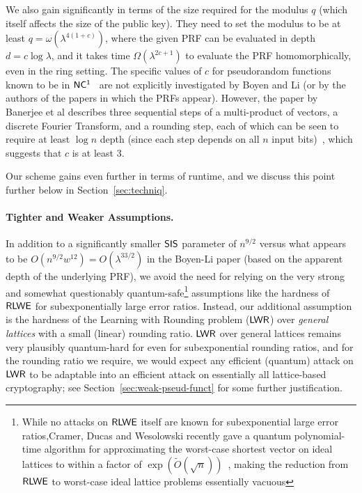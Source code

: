 We also gain significantly in terms of the size required for the
modulus $q$ (which itself affects the size of the public key). They
need to set the modulus to be at least $q=\omega(\lambda^{4(1+c)})$,
where the given PRF can be evaluated in depth $d=c\log{\lambda}$, and
it takes time $\Omega(\lambda^{2c+1})$ to evaluate the PRF
homomorphically, even in the ring setting. The specific values of $c$
for pseudorandom functions known to be in
$\mathsf{NC^{1}}$~\cite{DBLP:conf/eurocrypt/BanerjeePR12,DBLP:conf/crypto/0001P14,DBLP:journals/jacm/NaorR04,DBLP:conf/crypto/DottlingS15}
are not explicitly investigated by Boyen and Li (or by the authors of
the papers in which the PRFs appear). However, the paper by Banerjee
et al describes three sequential steps of a multi-product of vectors,
a discrete Fourier Transform, and a rounding step, each of which can
be seen to require at least $\log{n}$ depth (since each step depends
on all $n$ input bits)~\cite{DBLP:journals/siamcomp/ReifT92}, which suggests that $c$ is at least $3$.


Our scheme gains even further in terms of runtime, and we discuss this point further below in Section~\ref{sec:techniq}.

\paragraph{Tighter and Weaker Assumptions.}
In addition to a significantly smaller $\mathsf{SIS}$ parameter of $n^{9/2}$ versus
what appears to be $O(n^{9/2}w^{12})=O(\lambda^{33/2})$ in the
Boyen-Li paper (based on the apparent depth of the underlying PRF), we
avoid the need for relying on the very strong and somewhat
questionably quantum-safe\footnote{While no attacks on $\mathsf{RLWE}$ itself
  are known for subexponential large error ratios,Cramer, Ducas and
  Wesolowski recently gave a quantum polynomial-time algorithm for
  approximating the worst-case shortest vector on ideal lattices to
  within a factor of
  $\exp(\tilde{O}(\sqrt{n}))$~\cite{DBLP:journals/iacr/DucasS16},
  making the reduction from $\mathsf{RLWE}$ to worst-case ideal lattice
  problems essentially vacuous} assumptions like the hardness of
$\mathsf{RLWE}$ for subexponentially large error ratios. Instead, our
additional assumption is the hardness of the Learning with Rounding
problem ($\mathsf{LWR}$) over \emph{general lattices} with a small (linear)
rounding ratio. $\mathsf{LWR}$ over general lattices remains very plausibly
quantum-hard for even for subexponential rounding ratios, and for the
rounding ratio we require, we would expect any efficient (quantum)
attack on $\mathsf{LWR}$ to be adaptable into an efficient attack on
essentially all lattice-based cryptography; see
Section~\ref{sec:weak-pseud-funct} for some further justification.

